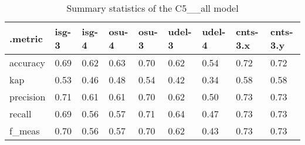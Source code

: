 \begin{table}[htbp]
\centering
\begin{tabular}{|l|llllllll|}
  \hline
.metric & isg-3 & isg-4 & osu-4 & osu-3 & udel-3 & udel-4 & cnts-3.x & cnts-3.y \\ 
  \hline
accuracy & 0.69 & 0.62 & 0.63 & 0.70 & 0.62 & 0.54 & 0.72 & 0.72 \\ 
  kap & 0.53 & 0.46 & 0.48 & 0.54 & 0.42 & 0.34 & 0.58 & 0.58 \\ 
  precision & 0.71 & 0.61 & 0.61 & 0.70 & 0.62 & 0.50 & 0.73 & 0.73 \\ 
  recall & 0.69 & 0.56 & 0.57 & 0.71 & 0.64 & 0.47 & 0.73 & 0.73 \\ 
  f\_meas & 0.70 & 0.56 & 0.57 & 0.70 & 0.62 & 0.43 & 0.73 & 0.73 \\ 
   \hline
\end{tabular}
\caption{Summary statistics of the C5\_\_all model} 
\label{tab:c5_all\_stat}
\end{table}
